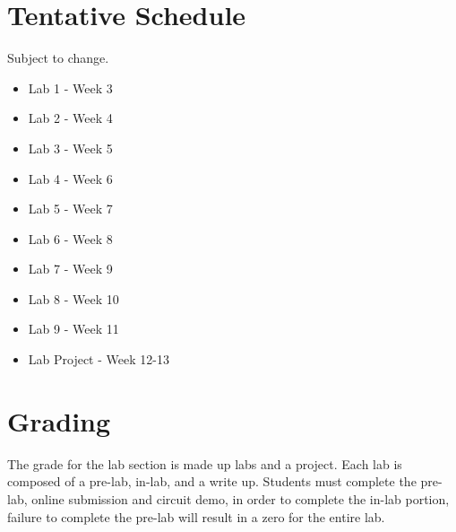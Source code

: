 \section{Tentative Schedule}

Subject to change. 

		\begin{itemize}
			\item Lab 1 - Week 3
			\item Lab 2 - Week 4
			\item Lab 3 - Week 5
			\item Lab 4 - Week 6
			\item Lab 5 - Week 7
			\item Lab 6 - Week 8
			\item Lab 7 - Week 9
			\item Lab 8 - Week 10
			\item Lab 9 - Week 11
			\item Lab Project - Week 12-13
		\end{itemize}


\section{Grading}

The grade for the lab section is made up labs and a project. Each lab is composed of a pre-lab, in-lab, and a write up. Students must complete the pre-lab, online submission and circuit demo, in order to complete the in-lab portion, failure to complete the pre-lab will result in a zero for the entire lab. 


